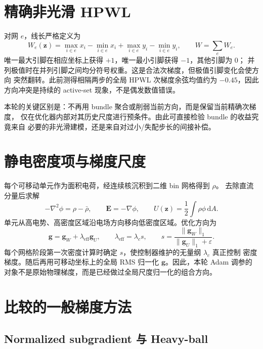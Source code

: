 \documentclass[UTF8,fontset=windows,a4paper,11pt]{ctexart}
\begin{document}
\section{精确非光滑 HPWL}

对网 $e$，线长严格定义为
\begin{equation}
 W_e(\bm z)=\max_{i\in e}x_i-\min_{i\in e}x_i+
             \max_{i\in e}y_i-\min_{i\in e}y_i,
 \qquad W=\sum_e W_e.
 \label{eq:hpwl}
\end{equation}
唯一最大引脚在相应坐标上获得 $+1$，唯一最小引脚获得 $-1$，其他引脚为 0；
并列极值时在并列引脚之间均分符号权重。这是合法次梯度，但极值引脚变化会使方向
突然翻转。此前测得相隔两步的全局 HPWL 次梯度余弦均值约为 $-0.45$，因此
方向冲突是持续的 active-set 现象，不是偶发数值错误。

本轮的关键区别是：不再用 bundle 聚合或削弱当前方向，而是保留当前精确次梯度，
仅在优化器内部对其历史尺度进行预条件。由此可直接检验 bundle 的收益究竟来自
必要的非光滑建模，还是来自对过小/失配步长的间接补偿。

\section{静电密度项与梯度尺度}

每个可移动单元作为面积电荷，经连续核沉积到二维 bin 网格得到 $\rho$。
去除直流分量后求解
\begin{equation}
 -\nabla^2\phi=\rho-\bar\rho,
 \qquad \bm E=-\nabla\phi,
 \qquad U(\bm z)=\frac12\int\rho\phi\,\mathrm dA.
 \label{eq:electric}
\end{equation}
单元从高电势、高密度区域沿电场方向移向低密度区域。优化方向为
\begin{equation}
 \bm g=\bm g_W+\lambda_{\mathrm{eff}}\bm g_U,
 \qquad \lambda_{\mathrm{eff}}=\lambda_c s,
 \qquad s=\frac{\|\bm g_W\|_1}{\|\bm g_U\|_1+\varepsilon}.
 \label{eq:combined}
\end{equation}
每个网格阶段第一次密度计算时确定 $s$，使控制器维护的无量纲 $\lambda_c$ 真正控制
密度梯度。随后再用可移动坐标上的全局 RMS 归一化 $\bm g$。因此，本轮 Adam
调参的对象不是原始物理梯度，而是已经做过全局尺度归一化的组合方向。

\section{比较的一般梯度方法}

\subsection{Normalized subgradient 与 Heavy-ball}
\end{document}
